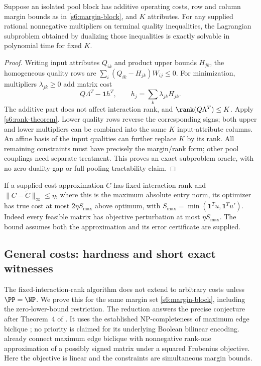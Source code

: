 \begin{corollary}\label{s6:oracle}
Suppose an isolated pool block has additive operating costs, row and
column margin bounds as in \eqref{s6:margin-block}, and $K$ attributes.
For any supplied rational nonnegative multipliers on terminal quality
inequalities, the Lagrangian subproblem obtained by dualizing those
inequalities is exactly solvable in polynomial time for fixed $K$.
\end{corollary}
\begin{proof}
Writing input attributes $Q_{ik}$ and product upper bounds $H_{jk}$,
the homogeneous quality rows are
$\sum_i(Q_{ik}-H_{jk})W_{ij}\le0$.
For minimization, multipliers $\lambda_{jk}\ge0$ add matrix cost
\[
 Q\Lambda^T-\mathbf1 h^T,\qquad h_j=\sum_k\lambda_{jk}H_{jk}.
\]
The additive part does not affect interaction rank, and
$\rank(Q\Lambda^T)\le K$. Apply \cref{s6:rank-theorem}.
Lower quality rows reverse the corresponding signs; both upper and lower
multipliers can be combined into the same $K$ input-attribute columns.
An affine basis of the input qualities can further replace $K$ by its
rank. All remaining constraints must have precisely the margin/rank form;
other pool couplings need separate treatment. This proves an exact
subproblem oracle, with no zero-duality-gap or full pooling tractability
claim.
\end{proof}
If a supplied cost approximation $\widetilde C$ has fixed interaction
rank and $\|C-\widetilde C\|_\infty\le\eta$, where this is the maximum
absolute entry norm, its optimizer has true cost at most
$2\eta S_{\max}$ above optimum, with
$S_{\max}=\min(\mathbf1^Tu,\mathbf1^Tu')$. Indeed every feasible
matrix has objective perturbation at most $\eta S_{\max}$. The bound
assumes both the approximation and its error certificate are supplied.


\subsection{General costs: hardness and short exact witnesses}

The fixed-interaction-rank algorithm does not extend to arbitrary costs
unless $\PP=\NP$. We prove this for the same margin set
\eqref{s6:margin-block}, including the zero-lower-bound restriction.
The reduction answers the precise conjecture after Theorem~4 of
\citet{dey2020-convexifications-of-rank-one-based}. It uses the
established NP-completeness of maximum edge biclique
\cite{app:peeters2003}; no priority is claimed for its underlying
Boolean bilinear encoding. \citet{app:gillis2014} already connect
maximum edge biclique with nonnegative rank-one approximation of a
possibly signed matrix under a squared Frobenius objective. Here the
objective is linear and the constraints are simultaneous margin bounds.

